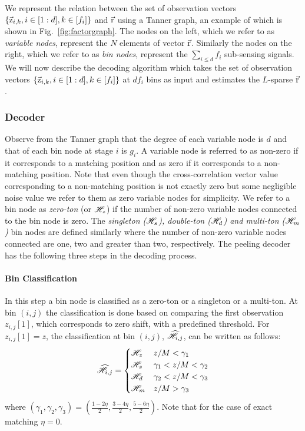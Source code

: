 We represent the relation between the set of observation vectors $\{\vec{\mathrm{z}}_{i,k},i\in[1:d],k\in[f_i]\}$ and $\vec{\mathrm{r}}$ using a Tanner graph, an example of which is shown in Fig.~\ref{fig:factorgraph}. The nodes on the left, which we refer to as {\it variable nodes}, represent the $N$ elements of vector $\vec{\mathrm{r}}$. Similarly the nodes on the right, which we refer to as {\it bin nodes}, represent the $\sum_{i\leq d} f_i$ sub-sensing signals. We will now describe the decoding algorithm which takes the set of observation vectors $\{\vec{\mathrm{z}}_{i,k},i\in[1:d],k\in[f_i]\}$ at $df_i$ bins as input and estimates the $L$-sparse $\vec{\mathrm{r}}$.	

\subsubsection{Decoder}		
	Observe from the Tanner graph that the degree of each variable node is $d$ and that of each bin node at stage $i$ is $g_i$. A variable node is referred to as non-zero if it corresponds to a matching position and as zero if it corresponds to a non-matching position. Note that even though the cross-correlation vector value corresponding to a non-matching position is not exactly zero but some negligible noise value we refer to them as zero variable nodes for simplicity. We refer to a bin node as {\it zero-ton} (or $\mathscr{H}_z$) if the number of non-zero variable nodes connected to the bin node is zero. The {\it singleton ($\mathscr{H}_s$), double-ton ($\mathscr{H}_d$) and multi-ton ($\mathscr{H}_m$)} bin nodes are defined similarly where the number of non-zero variable nodes connected are one, two and greater than two, respectively. The peeling decoder has the following three steps in the decoding process.

\paragraph*{Bin Classification} In this step a bin node is classified as a zero-ton or a singleton or a multi-ton. At bin $(i,j)$ the classification is done based on  comparing the first observation $z_{i,j}[1]$, which corresponds to zero shift, with a predefined threshold. For $z_{i,j}[1]=z$, the classification at bin $(i,j)$, $\widehat{\mathscr{H}}_{i,j}$, can be written as follows:
\begin{align}
\label{Eqn:BinClassifApprox}
\widehat{\mathscr{H}}_{i,j}=
\begin{cases}
\mathscr{H}_z &  	 z/M < \gamma_1\\
\mathscr{H}_s &	  \gamma_1 < z/M < \gamma_2  \\
\mathscr{H}_d  &    \gamma_2  < z/M <  \gamma_3\\
\mathscr{H}_m &      z/M > \gamma_3\\
\end{cases}
\end{align}
where $(\gamma_1,\gamma_2,\gamma_3)=(\frac{1-2\eta}{2},\frac{3-4\eta}{2},\frac{5-6\eta}{2})$. Note that for the case of exact matching $\eta=0$.
